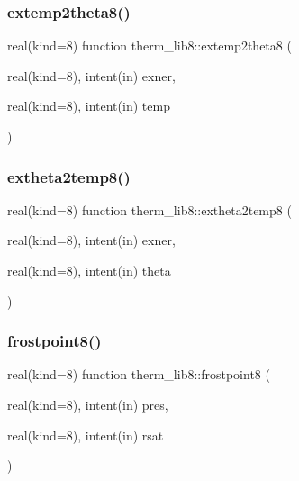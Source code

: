 \subsubsection{\texorpdfstring{extemp2theta8()}{extemp2theta8()}}
{\footnotesize\ttfamily real(kind=8) function therm\+\_\+lib8\+::extemp2theta8 (\begin{DoxyParamCaption}\item[{real(kind=8), intent(in)}]{exner,  }\item[{real(kind=8), intent(in)}]{temp }\end{DoxyParamCaption})}

\mbox{\label{namespacetherm__lib8_ac210423ab55881e57a525b8f13593fa3}} 
\subsubsection{\texorpdfstring{extheta2temp8()}{extheta2temp8()}}
{\footnotesize\ttfamily real(kind=8) function therm\+\_\+lib8\+::extheta2temp8 (\begin{DoxyParamCaption}\item[{real(kind=8), intent(in)}]{exner,  }\item[{real(kind=8), intent(in)}]{theta }\end{DoxyParamCaption})}

\mbox{\label{namespacetherm__lib8_a137ef754961bd0772247f311c22e160f}} 
\subsubsection{\texorpdfstring{frostpoint8()}{frostpoint8()}}
{\footnotesize\ttfamily real(kind=8) function therm\+\_\+lib8\+::frostpoint8 (\begin{DoxyParamCaption}\item[{real(kind=8), intent(in)}]{pres,  }\item[{real(kind=8), intent(in)}]{rsat }\end{DoxyParamCaption})}

